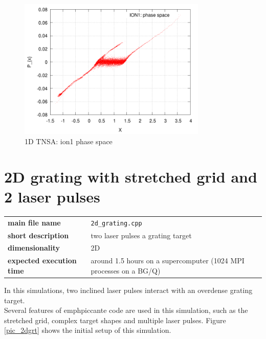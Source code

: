\documentclass[11pt,a4paper]{report}
\begin{document}
    
    \begin{figure}[htbp]
    \centering
    \includegraphics[width=0.80\textwidth]{TNSA1d.png}
    \caption{1D TNSA: ion1 phase space}
	\label{pic_1dTNSA}    
    \end{figure}    

\section{2D grating with stretched grid and 2 laser pulses}
\begin{center}
    \begin{tabular}{ l | l }
    	\textbf{main file name} & \verb+2d_grating.cpp+\\
    	\textbf{short description} & two laser pulses  a grating target \\
    	\textbf{dimensionality} & 2D  \\
    	\textbf{expected execution time} & around 1.5 hours on a supercomputer (1024 MPI processes on a BG/Q)
    \end{tabular}
    \end{center}
In this simulations, two inclined laser pulses interact with an overdense grating target. \\
Several features of emph{piccante} code are used in this simulation, such as the stretched grid, complex target shapes and multiple laser pulses. Figure \ref{pic_2dgrt} shows the initial setup of this simulation.
\end{document}
